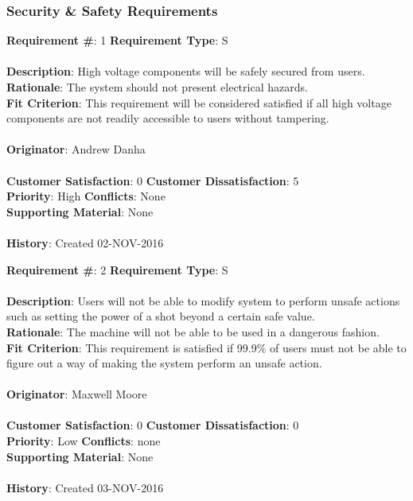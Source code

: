 \documentclass[titlepage]{article}
\begin{document}
\subsubsection{Security \& Safety Requirements}
\begin{framed}
	\noindent\textbf{Requirement \#}: 1 \hfill \textbf{Requirement Type}: S \hfill\\\\
	\noindent\textbf{Description}: High voltage components will be safely secured from users.\\
	\textbf{Rationale}: The system should not present electrical hazards.\\
	\textbf{Fit Criterion}: This requirement will be considered satisfied if all high voltage components are not readily accessible to users without tampering.\\\\
	\textbf{Originator}: Andrew Danha\\\\
	\noindent\textbf{Customer Satisfaction}: 0 \hfill 	\textbf{Customer Dissatisfaction}: 5 \hfill\\
	\textbf{Priority}: High \hfill \textbf{Conflicts}: None \hfill\\
	\textbf{Supporting Material}: None\\\\
	\noindent\textbf{History}: Created 02-NOV-2016
\end{framed}

\begin{framed}
	\noindent\textbf{Requirement \#}: 2 \hfill \textbf{Requirement Type}: S \hfill\\\\
	\noindent\textbf{Description}: Users will not be able to modify system to perform unsafe actions such as setting the power of a shot beyond a certain safe value.\\
	\textbf{Rationale}: The machine will not be able to be used in a dangerous fashion.\\
	\textbf{Fit Criterion}: This requirement is satisfied if 99.9\% of users must not be able to figure out a way of making the system perform an unsafe action.\\\\
	\textbf{Originator}: Maxwell Moore\\\\
	\noindent\textbf{Customer Satisfaction}: 0 \hfill 	\textbf{Customer Dissatisfaction}: 0 \hfill\\
	\textbf{Priority}: Low \hfill \textbf{Conflicts}: none \hfill\\
	\textbf{Supporting Material}: None\\\\
	\noindent\textbf{History}: Created 03-NOV-2016
\end{framed}
\end{document}

